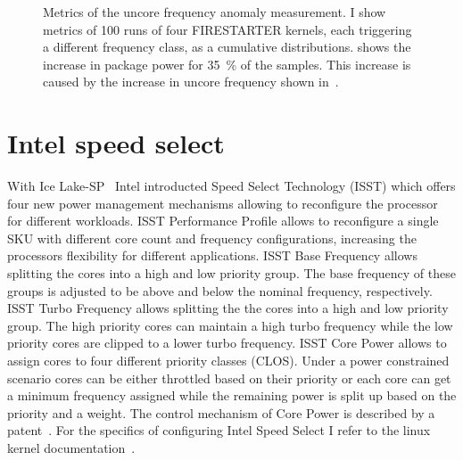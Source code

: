 \begin{figure}[t!]
    \caption{Metrics of the uncore frequency anomaly measurement.
    I show metrics of \SI{100}{} runs of four FIRESTARTER kernels, each triggering a different frequency class, as a cumulative distributions.
     shows the increase in package power for \SI{35}{\percent} of the samples.
    This increase is caused by the increase in uncore frequency shown in~.}
    \label{fig:avx-frequency-uncore-anomaly}
\end{figure}


\section{Intel speed select}
\label{sec:isst}
With Ice Lake-SP~\cite{Intel_2020_IceLake_SP} Intel introducted Speed Select Technology (ISST) which offers four new power management mechanisms allowing to reconfigure the processor for different workloads.
ISST Performance Profile allows to reconfigure a single SKU with different core count and frequency configurations, increasing the processors flexibility for different applications.
ISST Base Frequency allows splitting the cores into a high and low priority group.
The base frequency of these groups is adjusted to be above and below the nominal frequency, respectively.
ISST Turbo Frequency allows splitting the the cores into a high and low priority group.
The high priority cores can maintain a high turbo frequency while the low priority cores are clipped to a lower turbo frequency.
ISST Core Power allows to assign cores to four different priority classes (CLOS).
Under a power constrained scenario cores can be either throttled based on their priority or each core can get a minimum frequency assigned while the remaining power is split up based on the priority and a weight.
The control mechanism of Core Power is described by a patent~\cite[pages~87-111]{Intel_2021_HPM}.
For the specifics of configuring Intel Speed Select I refer to the linux kernel documentation~\cite{Kernel_IntelSpeedSelect}.

